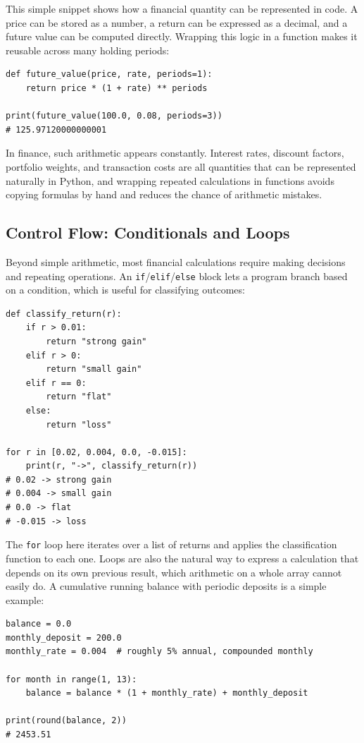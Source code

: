 \documentclass[../ai_in_finance]{subfiles}
\begin{document}
This simple snippet shows how a financial quantity can be represented in code. A price can be stored as a number, a return can be expressed as a decimal, and a future value can be computed directly. Wrapping this logic in a function makes it reusable across many holding periods:

\begin{verbatim}
def future_value(price, rate, periods=1):
    return price * (1 + rate) ** periods

print(future_value(100.0, 0.08, periods=3))
# 125.97120000000001
\end{verbatim}

In finance, such arithmetic appears constantly. Interest rates, discount factors, portfolio weights, and transaction costs are all quantities that can be represented naturally in Python, and wrapping repeated calculations in functions avoids copying formulas by hand and reduces the chance of arithmetic mistakes.

\subsection{Control Flow: Conditionals and Loops}

Beyond simple arithmetic, most financial calculations require making decisions and repeating operations. An \texttt{if}/\texttt{elif}/\texttt{else} block lets a program branch based on a condition, which is useful for classifying outcomes:

\begin{verbatim}
def classify_return(r):
    if r > 0.01:
        return "strong gain"
    elif r > 0:
        return "small gain"
    elif r == 0:
        return "flat"
    else:
        return "loss"

for r in [0.02, 0.004, 0.0, -0.015]:
    print(r, "->", classify_return(r))
# 0.02 -> strong gain
# 0.004 -> small gain
# 0.0 -> flat
# -0.015 -> loss
\end{verbatim}

The \texttt{for} loop here iterates over a list of returns and applies the classification function to each one. Loops are also the natural way to express a calculation that depends on its own previous result, which arithmetic on a whole array cannot easily do. A cumulative running balance with periodic deposits is a simple example:

\begin{verbatim}
balance = 0.0
monthly_deposit = 200.0
monthly_rate = 0.004  # roughly 5% annual, compounded monthly

for month in range(1, 13):
    balance = balance * (1 + monthly_rate) + monthly_deposit

print(round(balance, 2))
# 2453.51
\end{verbatim}
\end{document}
